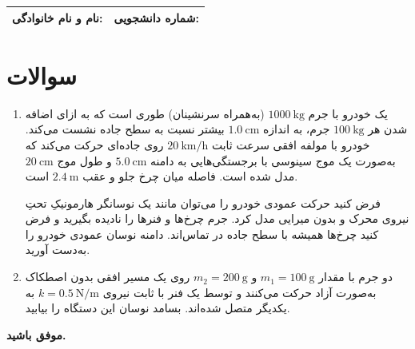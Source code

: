 \documentclass[12pt,a4paper]{article}
\begin{document}
	
	\begin{tabular}{|p{7cm}|p{7cm}|}
		\hline
		\textbf{نام و نام خانوادگی:} & \textbf{شماره دانشجویی:} \\
		\hline
	\end{tabular}
	
	\section*{سوالات}
	
	\begin{enumerate}
		\item
		یک خودرو با جرم \(1000\ \mathrm{kg}\) (به‌همراه سرنشینان) طوری است که به ازای اضافه شدن هر \(100\ \mathrm{kg}\) جرم، به اندازه \(1.0\ \mathrm{cm}\) بیشتر نسبت به سطح جاده نشست می‌کند.  
		خودرو با مولفه افقی سرعت ثابت \(20\ \mathrm{km/h}\) روی جاده‌ای حرکت می‌کند که به‌صورت یک موج سینوسی با برجستگی‌هایی به دامنه \(5.0\ \mathrm{cm}\) و طول موج \(20\ \mathrm{cm}\) مدل شده است. فاصله میان چرخ جلو و عقب \(2.4\ \mathrm{m}\) است.
		
		فرض کنید حرکت عمودی خودرو را می‌توان مانند یک نوسانگر هارمونیکِ تحتِ نیروی محرک و بدون میرایی مدل کرد. جرم چرخ‌ها و فنرها را نادیده بگیرید و فرض کنید چرخ‌ها همیشه با سطح جاده در تماس‌اند.  
		دامنه نوسان عمودی خودرو را به‌دست آورید.
		
		\item
		دو جرم با مقدار \(m_1 = 100\ \mathrm{g}\) و \(m_2 = 200\ \mathrm{g}\) روی یک مسیر افقی بدون اصطکاک به‌صورت آزاد حرکت می‌کنند و توسط یک فنر با ثابت نیروی \(k = 0.5\ \mathrm{N/m}\) به یکدیگر متصل شده‌اند.  
		بسامد نوسان این دستگاه را بیابید.
	\end{enumerate}
	
	\vspace{10pt}
	\textbf{موفق باشید.}
	
\end{document}
